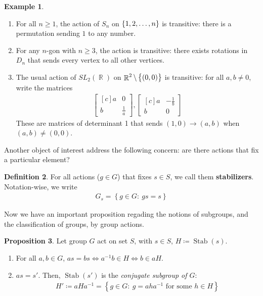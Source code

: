 \documentclass[11pt]{amsart} %
\theoremstyle{definition}
\newtheorem{definition}{Definition}[section]
\newtheorem{proposition}[definition]{Proposition}
\newtheorem{example}[definition]{Example}
\theoremstyle{definition}
\DeclareMathOperator{\R}{\mathbb{R}}
\DeclareMathOperator{\stab}{Stab}
\numberwithin{equation}{section}
\newcommand{\condset}[4]{\left\{ #1  : \: #2 #3 #4 \right\}}
\begin{document}
\begin{example}
	\begin{enumerate}
		\item For all $n \geq 1$, the action of $S_n$ on $\set{1,2,\dots,n}$ is transitive: there is a permutation sending $1$ to any number.
		\item For any $n$-gon with $n \geq 3$, the action is transitive: there exists rotations in $D_n$ that sends every vertex to all other vertices.
		\item The usual action of $SL_2 (\R)$ on $\R^2 \setminus \set{(0,0)}$ is transitive: for all $a,b \neq 0$, write the matrices
		\begin{align*}
		\begin{bmatrix*}[c]
		a & 0 \\ b & \frac{1}{a}
		\end{bmatrix*}, \begin{bmatrix*}[c]
		a & -\frac{1}{b} \\ b & 0
		\end{bmatrix*}
		\end{align*}
		These are matrices of determinant 1 that sends $(1,0) \to (a,b)$ when $(a,b) \neq (0,0)$.
	\end{enumerate}
\end{example}

Another object of interest address the following concern: are there actions that fix a particular element?

\begin{definition}
	\label{defstabilizer}
	For all actions ($g \in G$) that fixes $s \in S$, we call them \textbf{stabilizers}. Notation-wise, we write
	\begin{align*}
		G_s = \condset{g \in G}{gs}{=}{s}
	\end{align*}
\end{definition}

Now we have an important proposition regading the notions of subgroups, and the classification of groups, by group actions.

\begin{proposition}
	\label{propstabilizersconjugatesubgroup}
	Let group $G$ act on set $S$, with $s \in S$, $H \coloneqq \stab (s)$.
	\begin{enumerate}
		\item For all $a,b \in G$, $as = bs \iff a^{-1} b \in H \iff b \in aH$.
		\item $as = s'$. Then, $\stab (s')$ is the \textit{conjugate subgroup of $G$}: 
		\begin{align*}
		H' \coloneqq aHa^{-1} = \condset{g \in G}{g = aha^{-1}}{\text{ for some }}{h \in H}
		\end{align*}
	\end{enumerate}
\end{proposition}
\end{document}

